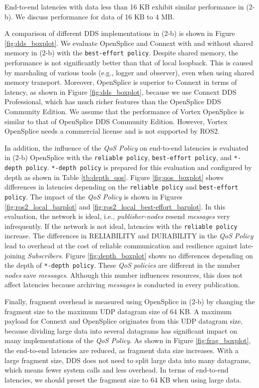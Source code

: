 \documentclass{sig-alternate-05-2015}
\begin{document}
End-to-end latencies with data less than 16 KB exhibit similar performance in (2-b).
We discuss performance for data of 16 KB to 4 MB.

A comparison of different DDS implementations in (2-b) is shown in Figure \ref{fig:dds_boxplot}.
We evaluate OpenSplice and Connext with and without shared memory in (2-b) with the \texttt{best-effort policy}.
Despite shared memory, the performance is not significantly better than that of local loopback. 
This is caused by marshaling of various tools (e.g., logger and observer), even when using shared memory transport.
Moreover, OpenSplice is superior to Connext in terms of latency, as shown in Figure \ref{fig:dds_boxplot}, because we use Connext DDS Professional, which has much richer features than the OpenSplice DDS Community Edition.
We assume that the performance of Vortex OpenSplice is similar to that of OpenSplice DDS Community Edition.
However, Vortex OpenSplice needs a commercial license and is not supported by ROS2.

In addition, the influence of the \emph{QoS Policy} on end-to-end latencies is evaluated in (2-b) OpenSplice with the \texttt{reliable policy}, \texttt{best-effort policy}, and \texttt{*-depth policy}.
\texttt{*-depth policy} is prepared for this evaluation and configured by depth as shown in Table \ref{tb:depth_qos}.
Figure \ref{fig:qos_boxplot} shows differences in latencies depending on the \texttt{reliable policy} and \texttt{best-effort policy}.
The impact of the \emph{QoS Policy} is shown in Figures \ref{fig:ros2_local_barplot} and \ref{fig:ros2_local_best-effort_barplot}.
In this evaluation, the network is ideal, i.e., \emph{publisher-nodes} resend \emph{messages} very infrequently.
If the network is not ideal, latencies with the \texttt{reliable policy} increase.
The differences in RELIABILITY and DURABILITY in the \emph{QoS Policy} lead to overhead at the cost of reliable communication and resilience against late-joining \emph{Subscribers}.
Figure \ref{fig:depth_boxplot} shows no differences depending on the depth of \texttt{*-depth policy}.
These \emph{QoS policies} are different in the number \emph{nodes} save \emph{messages}.
Although this number influences resources, this does not affect latencies because archiving \emph{messages} is conducted in every publication.

Finally, fragment overhead is measured using OpenSplice in (2-b) by changing the fragment size to the maximum UDP datagram size of 64 KB. 
A maximum payload for Connext and OpenSplice originates from this UDP datagram size, because dividing large data into several datagrams has significant impact on many implementations of the \emph{QoS Policy}.
As shown in Figure \ref{fig:frag_boxplot}, the end-to-end latencies are reduced, as fragment data size increases.
With a large fragment size, DDS does not need to split large data into many datagrams, which means fewer system calls and less overhead.
In terms of end-to-end latencies, we should preset the fragment size to 64 KB when using large data.
\end{document}
